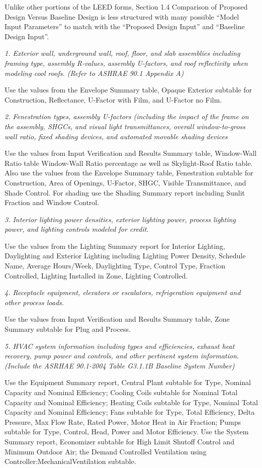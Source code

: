 Unlike other portions of the LEED forms, Section 1.4 Comparison of Proposed Design Versus Baseline Design is less structured with many possible ``Model Input Parameters'' to match with the ``Proposed Design Input'' and ``Baseline Design Input''.

\emph{1. Exterior wall, underground wall, roof, floor, and slab assemblies including framing type, assembly R-values, assembly U-factors, and roof reflectivity when modeling cool roofs. (Refer to ASHRAE 90.1 Appendix A)}

Use the values from the Envelope Summary table, Opaque Exterior subtable for Construction, Reflectance, U-Factor with Film, and U-Factor no Film.

\emph{2. Fenestration types, assembly U-factors (including the impact of the frame on the assembly, SHGCs, and visual light transmittances, overall window-to-gross wall ratio, fixed shading devices, and automated movable shading devices}

Use the values from Input Verification and Results Summary table, Window-Wall Ratio table Window-Wall Ratio percentage as well as Skylight-Roof Ratio table. Also use the values from the Envelope Summary table, Fenestration subtable for Construction, Area of Openings, U-Factor, SHGC, Visible Transmittance, and Shade Control. For shading use the Shading Summary report including Sunlit Fraction and Window Control.

\emph{3. Interior lighting power densities, exterior lighting power, process lighting power, and lighting controls modeled for credit.}

Use the values from the Lighting Summary report for Interior Lighting, Daylighting and Exterior Lighting including Lighting Power Density, Schedule Name, Average Hours/Week, Daylighting Type, Control Type, Fraction Controlled, Lighting Installed in Zone, Lighting Controlled.

\emph{4. Receptacle equipment, elevators or escalators, refrigeration equipment and other process loads.}

Use the values from Input Verification and Results Summary table, Zone Summary subtable for Plug and Process.

\emph{5. HVAC system information including types and efficiencies, exhaust heat recovery, pump power and controls, and other pertinent system information. (Include the ASRHAE 90.1-2004 Table G3.1.1B Baseline System Number)}

Use the Equipment Summary report, Central Plant subtable for Type, Nominal Capacity and Nominal Efficiency; Cooling Coils subtable for Nominal Total Capacity and Nominal Efficiency; Heating Coils subtable for Type, Nominal Total Capacity and Nominal Efficiency; Fans subtable for Type, Total Efficiency, Delta Pressure, Max Flow Rate, Rated Power, Motor Heat in Air Fraction; Pumps subtable for Type, Control, Head, Power and Motor Efficiency. Use the System Summary report, Economizer subtable for High Limit Shutoff Control and Minimum Outdoor Air; the Demand Controlled Ventilation using Controller:MechanicalVentilation subtable.

